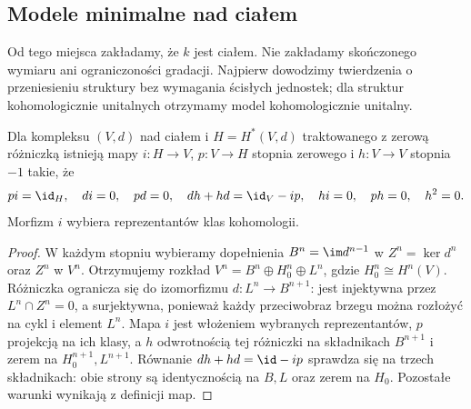 \subsection{Modele minimalne nad ciałem}

Od tego miejsca zakładamy, że $k$ jest ciałem. Nie zakładamy skończonego wymiaru ani ograniczoności gradacji. Najpierw dowodzimy twierdzenia o przeniesieniu struktury bez wymagania ścisłych jednostek; dla struktur kohomologicznie unitalnych otrzymamy model kohomologicznie unitalny.

\begin{lemat}\label{cat:lem:ainfty-contraction}
Dla kompleksu $(V,d)$ nad ciałem i $H=H^*(V,d)$ traktowanego z zerową różniczką istnieją mapy $i:H\to V$, $p:V\to H$ stopnia zerowego i $h:V\to V$ stopnia $-1$ takie, że
\[
 pi=\id_H,\quad di=0,\quad pd=0,\quad
 dh+hd=\id_V-ip,\quad hi=0,\quad ph=0,\quad h^2=0.
\]
Morfizm $i$ wybiera reprezentantów klas kohomologii.
\end{lemat}
\begin{proof}
W każdym stopniu wybieramy dopełnienia $B^n=\im d^{n-1}$ w $Z^n=\ker d^n$ oraz $Z^n$ w $V^n$. Otrzymujemy rozkład $V^n=B^n\oplus H_0^n\oplus L^n$, gdzie $H_0^n\cong H^n(V)$. Różniczka ogranicza się do izomorfizmu $d:L^n\to B^{n+1}$: jest injektywna przez $L^n\cap Z^n=0$, a surjektywna, ponieważ każdy przeciwobraz brzegu można rozłożyć na cykl i element $L^n$. Mapa $i$ jest włożeniem wybranych reprezentantów, $p$ projekcją na ich klasy, a $h$ odwrotnością tej różniczki na składnikach $B^{n+1}$ i zerem na $H_0^{n+1},L^{n+1}$. Równanie $dh+hd=\id-ip$ sprawdza się na trzech składnikach: obie strony są identycznością na $B,L$ oraz zerem na $H_0$. Pozostałe warunki wynikają z definicji map.
\end{proof}

